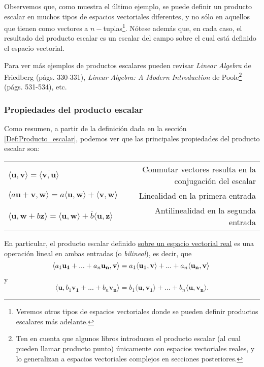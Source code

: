 \documentclass[12pt,dvipsnames]{article}
\begin{document}
\vspace{3mm}

Observemos que, como muestra el último ejemplo, se puede definir un producto escalar en muchos tipos de espacios vectoriales diferentes, y no sólo en aquellos que tienen como vectores a $n-$tuplas\footnote{Veremos otros tipos de espacios vectoriales donde se pueden definir productos escalares más adelante.}. Nótese además que, en cada caso, el resultado del producto escalar es un escalar del campo sobre el cual está definido el espacio vectorial.

\vspace{3mm}

Para ver más ejemplos de productos escalares pueden revisar \emph{Linear Algebra} de Friedberg (págs. 330-331), \textit{Linear Algebra: A Modern Introduction} de Poole\footnote{Ten en cuenta que algunos libros introducen el producto escalar (al cual pueden llamar producto punto) únicamente con espacios vectoriales reales, y lo generalizan a espacios vectoriales complejos en secciones posteriores.} (págs. 531-534), etc.


\subsubsection{Propiedades del producto escalar} \label{Prop:Producto_escalar}

Como resumen, a partir de la definición dada en la sección \ref{Def:Producto_escalar}, podemos ver que las principales propiedades del producto escalar son:

\begin{center}
    \begin{tabular}{lr}
        $\langle\mathbf{u},\mathbf{v}\rangle = \overline{\langle\mathbf{v},\mathbf{u}\rangle}$ & Conmutar vectores resulta en la conjugación del escalar \\
        $\langle a\mathbf{u}+\mathbf{v},\mathbf{w}\rangle = a\langle\mathbf{u},\mathbf{w}\rangle + \langle\mathbf{v},\mathbf{w}\rangle$ & Linealidad en la primera entrada\\
        $\langle\mathbf{u},\mathbf{w}+b\mathbf{z}\rangle = \langle\mathbf{u},\mathbf{w}\rangle + \overline{b}\langle\mathbf{u},\mathbf{z}\rangle$ & Antilinealidad en la segunda entrada\\
    \end{tabular}{}
\end{center}{}

En particular, el producto escalar definido \underline{sobre un espacio vectorial real} es una operación lineal en ambas entradas (o \emph{bilineal}), es decir, que $$\langle a_1\mathbf{u_1}+...+a_n\mathbf{u_n},\mathbf{v}\rangle=a_1\langle\mathbf{u_1},\mathbf{v}\rangle+...+a_n\langle\mathbf{u_n},\mathbf{v}\rangle\hspace{1mm}$$ \noindent y $$\langle\mathbf{u},b_1\mathbf{v_1}+...+b_n\mathbf{v_n}\rangle=b_1\langle\mathbf{u},\mathbf{v_1}\rangle+...+b_n\langle\mathbf{u},\mathbf{v_n}\rangle.$$
\end{document}
